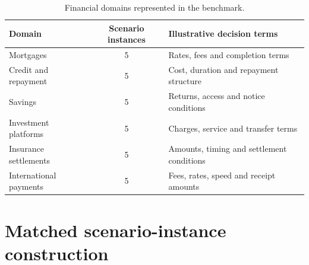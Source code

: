 \documentclass[12pt,a4paper,oneside]{report}
\newcommand{\rev}[1]{#1}
\begin{document}
\begin{table}[htbp]
\centering
\caption{\rev{Financial domains represented in the benchmark.}}
\label{tab:data_domains}
\small
\begin{tabularx}{0.92\textwidth}{@{}YcY@{}}
\toprule
\rev{\textbf{Domain}} & \rev{\textbf{Scenario instances}} & \rev{\textbf{Illustrative decision terms}} \\
\midrule
\rev{Mortgages} & \rev{5} & \rev{Rates, fees and completion terms} \\
\rev{Credit and repayment} & \rev{5} & \rev{Cost, duration and repayment structure} \\
\rev{Savings} & \rev{5} & \rev{Returns, access and notice conditions} \\
\rev{Investment platforms} & \rev{5} & \rev{Charges, service and transfer terms} \\
\rev{Insurance settlements} & \rev{5} & \rev{Amounts, timing and settlement conditions} \\
\rev{International payments} & \rev{5} & \rev{Fees, rates, speed and receipt amounts} \\
\bottomrule
\end{tabularx}
\end{table}

\section[Matched scenario-instance construction]{\rev{Matched scenario-instance construction}}
\end{document}
